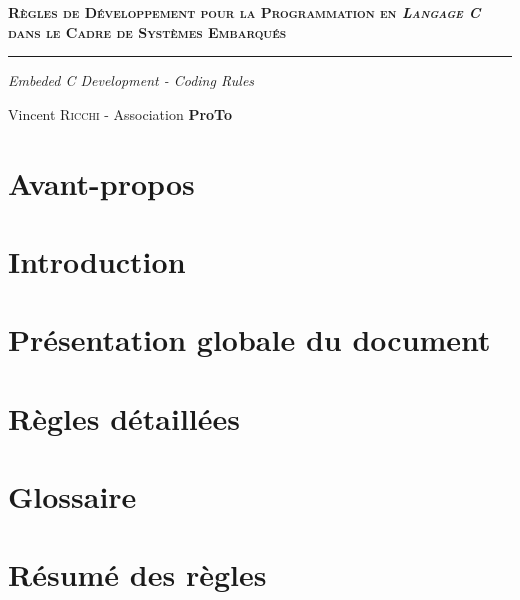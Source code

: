 \documentclass[a4paper, titlepage]{article}
\begin{document}
\begin{titlepage}
  \begin{flushleft}\huge\bfseries\scshape
    Règles de Développement pour la Programmation en \textit{Langage C} dans le Cadre de Systèmes Embarqués
  \end{flushleft}
  \hrule
  \begin{flushright}\LARGE\slshape
    Embeded C Development - Coding Rules
  \end{flushright}
  \begin{center}
    Vincent \textsc{Ricchi} - Association \textbf{ProTo}
  \end{center}
\end{titlepage}


\part*{Avant-propos}


\tableofcontents

\pagebreak

\part{Introduction}


\part{Présentation globale du document}


\part{Règles détaillées}








\appendix

\pagebreak

\part*{Glossaire}


\pagebreak

\part*{Résumé des règles}

\end{document}
